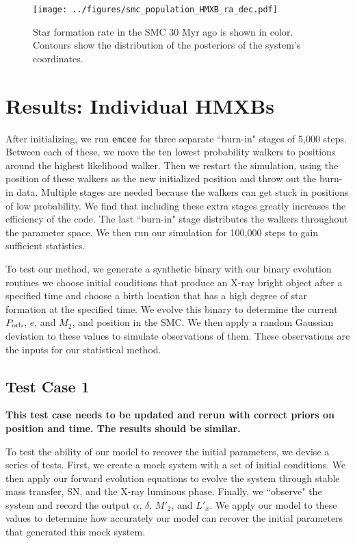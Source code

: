 \documentclass[12pt, preprint]{aastex}
\newcommand{\Porb}{\ifmmode {P_{\rm orb}}\else${P_{\rm orb}}$\fi}
\begin{document}
\begin{figure}[h!]
\begin{center}
\texttt{[image: ../figures/smc\_population\_HMXB\_ra\_dec.pdf]}
\caption{ Star formation rate in the SMC 30 Myr ago is shown in color. Contours show the distribution of the posteriors of the system's coordinates.}
\label{fig:population_ra_dec}
\end{center}
\end{figure}




\section{Results: Individual HMXBs}


After initializing, we run {\tt emcee} for three separate ``burn-in" stages of 5,000 steps. Between each of these, we move the ten lowest probability walkers to positions around the highest likelihood walker. Then we restart the simulation, using the position of these walkers as the new initialized position and throw out the burn-in data. Multiple stages are needed because the walkers can get stuck in positions of low probability. We find that including these extra stages greatly increases the efficiency of the code. The last ``burn-in" stage distributes the walkers throughout the parameter space. We then run our simulation for 100,000 steps to gain sufficient statistics. 

To test our method, we generate a synthetic binary with our binary evolution routines we choose initial conditions that produce an X-ray bright object after a specified time and choose a birth location that has a high degree of star formation at the specified time. We evolve this binary to determine the current \Porb, $e$, and $M_2$, and position in the SMC. We then apply a random Gaussian deviation to these values to simulate observations of them. These observations are the inputs for our statistical method. 


\subsection{Test Case 1}

{\bf This test case needs to be updated and rerun with correct priors on position and time. The results should be similar.}

To test the ability of our model to recover the initial parameters, we devise a series of tests. First, we create a mock system with a set of initial conditions. We then apply our forward evolution equations to evolve the system through stable mass transfer, SN, and the X-ray luminous phase. Finally, we ``observe" the system and record the output $\alpha$, $\delta$, $M'_2$, and $L'_x$. We apply our model to these values to determine how accurately our model can recover the initial parameters that generated this mock system. 
\end{document}
